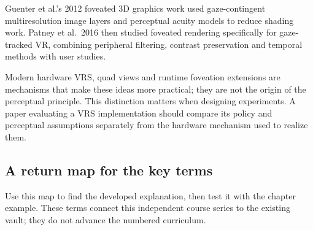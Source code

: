 Guenter et al.'s 2012 foveated 3D graphics work used gaze-contingent multiresolution image layers and perceptual acuity models to reduce shading work. Patney et al.~2016 then studied foveated rendering specifically for gaze-tracked VR, combining peripheral filtering, contrast preservation and temporal methods with user studies.

Modern hardware VRS, quad views and runtime foveation extensions are mechanisms that make these ideas more practical; they are not the origin of the perceptual principle. This distinction matters when designing experiments. A paper evaluating a VRS implementation should compare its policy and perceptual assumptions separately from the hardware mechanism used to realize them.

\subsection{A return map for the key terms}\label{04-visual-computing-ii-ch035-a-return-map-for-the-key-terms}

Use this map to find the developed explanation, then test it with the chapter example. These terms connect this independent course series to the existing vault; they do not advance the numbered curriculum.

